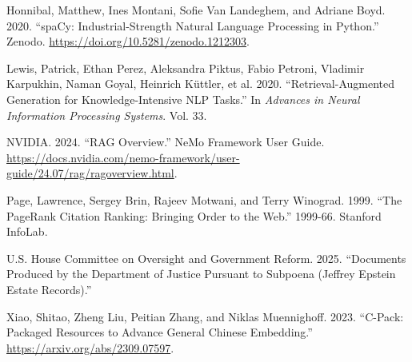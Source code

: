 \documentclass[
  letterpaper,
  DIV=11,
  numbers=noendperiod]{scrartcl}
\newlength{\cslhangindent}
\newenvironment{CSLReferences}[2] %
 {\begin{list}{}{%
  \setlength{\itemindent}{0pt}
  \setlength{\leftmargin}{0pt}
  \setlength{\parsep}{0pt}
  \ifodd #1
   \setlength{\leftmargin}{\cslhangindent}
   \setlength{\itemindent}{-1\cslhangindent}
  \fi
  \setlength{\itemsep}{#2\baselineskip}}}
 {\end{list}}
\begin{document}
\begin{CSLReferences}{1}{0}
Honnibal, Matthew, Ines Montani, Sofie Van Landeghem, and Adriane Boyd.
2020. {``{spaCy}: Industrial-Strength Natural Language Processing in
{Python}.''} Zenodo. \url{https://doi.org/10.5281/zenodo.1212303}.

Lewis, Patrick, Ethan Perez, Aleksandra Piktus, Fabio Petroni, Vladimir
Karpukhin, Naman Goyal, Heinrich Küttler, et al. 2020.
{``Retrieval-Augmented Generation for Knowledge-Intensive {NLP}
Tasks.''} In \emph{Advances in Neural Information Processing Systems}.
Vol. 33.

NVIDIA. 2024. {``{RAG} Overview.''} NeMo Framework User Guide.
\url{https://docs.nvidia.com/nemo-framework/user-guide/24.07/rag/ragoverview.html}.

Page, Lawrence, Sergey Brin, Rajeev Motwani, and Terry Winograd. 1999.
{``The {PageRank} Citation Ranking: Bringing Order to the Web.''}
1999-66. Stanford InfoLab.

U.S. House Committee on Oversight and Government Reform. 2025.
{``Documents Produced by the Department of Justice Pursuant to Subpoena
(Jeffrey Epstein Estate Records).''}

Xiao, Shitao, Zheng Liu, Peitian Zhang, and Niklas Muennighoff. 2023.
{``{C-Pack}: Packaged Resources to Advance General {Chinese}
Embedding.''} \url{https://arxiv.org/abs/2309.07597}.

\end{CSLReferences}
\end{document}
